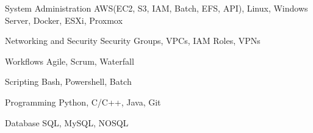 
\begin{cvskills}

  \cvskill
    {System Administration} %
    {AWS(EC2, S3, IAM, Batch, EFS, API), Linux, Windows Server, Docker, ESXi, Proxmox} %

  \cvskill
    {Networking and Security} %
    {Security Groups, VPCs, IAM Roles, VPNs} %
    
  \cvskill
    {Workflows} %
    {Agile, Scrum, Waterfall} %
    
  \cvskill
    {Scripting} %
    {Bash, Powershell, Batch} %

  \cvskill
    {Programming} %
    {Python, C/C++, Java, Git} %
    
  \cvskill
    {Database} %
    {SQL, MySQL, NOSQL} %
    
\end{cvskills}
